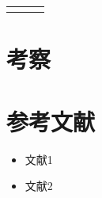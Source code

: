 \documentclass[a4j]{jarticle}
\begin{document}
\begin{table}[htb]
\begin{center}
\begin{tabular}{ccc}
\begin{minipage}{0.33\hsize}
\end{minipage}
\end{tabular}
\end{center}
\end{table}


\section{考察}

\section{参考文献}
\begin{itemize} 
\item 文献1
\item 文献2
\end{itemize}
\end{document}

